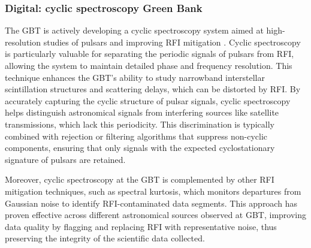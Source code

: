 
\subsubsection{Digital: cyclic spectroscopy Green Bank}

The GBT is actively developing a cyclic spectroscopy system aimed at high-resolution studies of pulsars and improving RFI mitigation \citep{dolch2021deconvolving}. Cyclic spectroscopy is particularly valuable for separating the periodic signals of pulsars from RFI, allowing the system to maintain detailed phase and frequency resolution. This technique enhances the GBT’s ability to study narrowband interstellar scintillation structures and scattering delays, which can be distorted by RFI. By accurately capturing the cyclic structure of pulsar signals, cyclic spectroscopy helps distinguish astronomical signals from interfering sources like satellite transmissions, which lack this periodicity. This discrimination is typically combined with rejection or filtering algorithms that suppress non-cyclic components, ensuring that only signals with the expected cyclostationary signature of pulsars are retained.

Moreover, cyclic spectroscopy at the GBT is complemented by other RFI mitigation techniques, such as spectral kurtosis, which monitors departures from Gaussian noise to identify RFI-contaminated data segments. This approach has proven effective across different astronomical sources observed at GBT, improving data quality by flagging and replacing RFI with representative noise, thus preserving the integrity of the scientific data collected.


